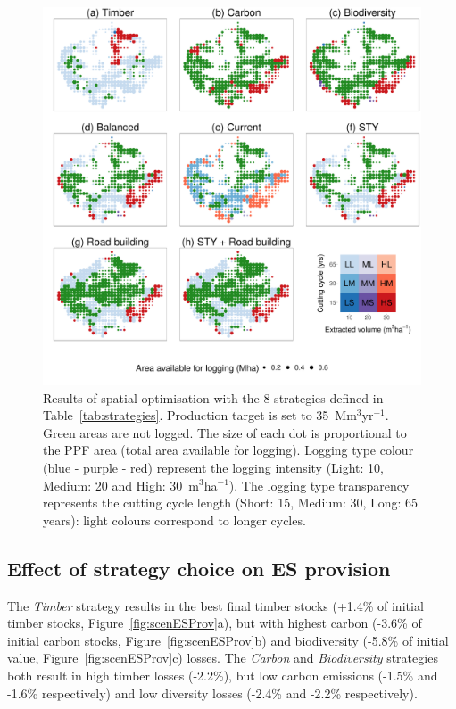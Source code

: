 \documentclass{article}
\begin{document}
\begin{figure}
    \centering
    \includegraphics[width=0.8\linewidth]{graphs/mapsScenarios.pdf}
    \caption{Results of spatial optimisation with the 8 strategies defined in Table~\ref{tab:strategies}. Production target is set to 35~Mm$^3$yr$^{-1}$. Green areas are not logged. The size of each dot is proportional to the PPF area (total area available for logging). Logging type colour (blue - purple - red) represent the logging intensity (Light: 10, Medium: 20 and High: 30~m$^3$ha$^{-1}$). The logging type transparency represents the cutting cycle length (Short: 15, Medium: 30, Long: 65 years): light colours correspond to longer cycles.}
    \label{fig:mapsStrateg}
\end{figure}

\subsection{Effect of strategy choice on ES provision}

The \textit{Timber} strategy results in the best final timber stocks (+1.4\% of initial timber stocks, Figure~\ref{fig:scenESProv}a), but with highest carbon (-3.6\% of initial carbon stocks, Figure~\ref{fig:scenESProv}b) and biodiversity (-5.8\% of initial value, Figure~\ref{fig:scenESProv}c) losses. The \textit{Carbon} and \textit{Biodiversity} strategies both result in high timber losses (-2.2\%), but low carbon emissions (-1.5\% and -1.6\% respectively) and low diversity losses (-2.4\% and -2.2\% respectively). 
\end{document}
